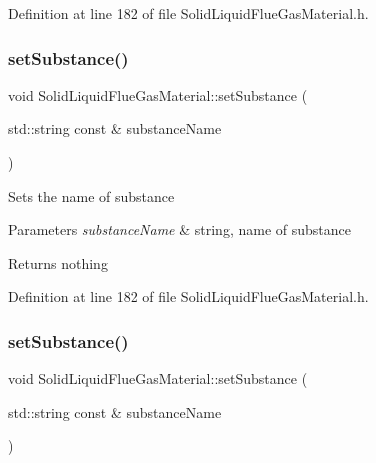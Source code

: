 Definition at line 182 of file Solid\+Liquid\+Flue\+Gas\+Material.\+h.

\mbox{\label{class_solid_liquid_flue_gas_material_a54be915432c1300c4d8eaf7bf2be361f}} 
\subsubsection{\texorpdfstring{set\+Substance()}{setSubstance()}\hspace{0.1cm}{\footnotesize\ttfamily [2/3]}}
{\footnotesize\ttfamily void Solid\+Liquid\+Flue\+Gas\+Material\+::set\+Substance (\begin{DoxyParamCaption}\item[{std\+::string const \&}]{substance\+Name }\end{DoxyParamCaption})\hspace{0.3cm}{\ttfamily [inline]}}

Sets the name of substance 
\begin{DoxyParams}{Parameters}
{\em substance\+Name} & string, name of substance \\
\hline
\end{DoxyParams}
\begin{DoxyReturn}{Returns}
nothing 
\end{DoxyReturn}


Definition at line 182 of file Solid\+Liquid\+Flue\+Gas\+Material.\+h.

\mbox{\label{class_solid_liquid_flue_gas_material_a54be915432c1300c4d8eaf7bf2be361f}} 
\subsubsection{\texorpdfstring{set\+Substance()}{setSubstance()}\hspace{0.1cm}{\footnotesize\ttfamily [3/3]}}
{\footnotesize\ttfamily void Solid\+Liquid\+Flue\+Gas\+Material\+::set\+Substance (\begin{DoxyParamCaption}\item[{std\+::string const \&}]{substance\+Name }\end{DoxyParamCaption})\hspace{0.3cm}{\ttfamily [inline]}}


